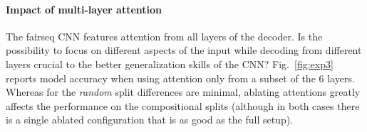 

\paragraph{Impact of multi-layer attention}
\label{subsec:exp3}

The fairseq CNN features attention from all layers of the
decoder. Is the possibility to focus on different aspects of the input
while decoding from different layers crucial to the better
generalization skills of the CNN? Fig.~\ref{fig:exp3} reports model
accuracy when using attention only from a subset of the 6
layers. Whereas for the \emph{random} split differences are minimal,
ablating attentions greatly affects the performance on the
compositional splits (although in both cases there is a single ablated
configuration that is as good as the full setup).

